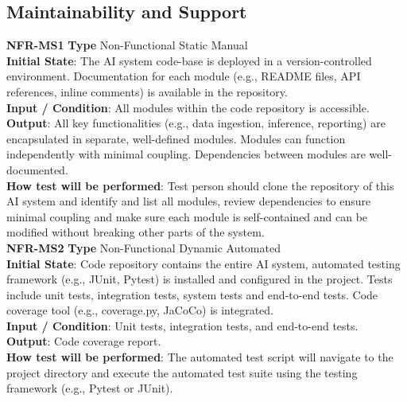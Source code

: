 \documentclass[12pt, titlepage]{article}
\begin{document}
\subsection{Maintainability and Support}
\textbf{NFR-MS1} \textbf{Type} Non-Functional Static Manual\\
        \indent \textbf{Initial State}: The AI system code-base is deployed in a version-controlled environment. Documentation for each module (e.g., README files, API references, inline comments) is available in the repository.\\
        \indent \textbf{Input / Condition}: All modules within the code repository is accessible.\\
        \indent \textbf{Output}: All key functionalities (e.g., data ingestion, inference, reporting) are encapsulated in separate, well-defined modules. Modules can function independently with minimal coupling. Dependencies between modules are well-documented.\\
        \indent \textbf{How test will be performed}: Test person should clone the repository of this AI system and identify and list all modules, review dependencies to ensure minimal coupling and make sure each module is self-contained and can be modified without breaking other parts of the system.\\
        
\noindent \textbf{NFR-MS2} \textbf{Type} Non-Functional Dynamic Automated\\
        \indent \textbf{Initial State}: Code repository contains the entire AI system, automated testing framework (e.g., JUnit, Pytest)  is installed and configured in the project. Tests include unit tests, integration tests, system tests and end-to-end tests. Code coverage tool (e.g., coverage.py, JaCoCo) is integrated.\\
        \indent \textbf{Input / Condition}: Unit tests, integration tests, and end-to-end tests.\\
        \indent \textbf{Output}: Code coverage report.\\
        \indent \textbf{How test will be performed}: The automated test script will navigate to the project directory and execute the automated test suite using the testing framework (e.g., Pytest or JUnit).\\
\end{document}
